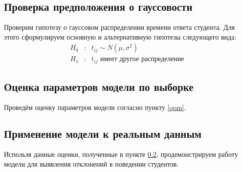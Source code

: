 \subsection{Проверка предположения о гауссовости}

Проверим гипотезу о гауссовом распределении времени ответа студента. Для этого сформулируем основную и альтернативную гипотезы следующего вида:
$$
\begin{array}{lll}
H_0 &:& t_{ij} \sim N\left(\mu,\sigma^2\right)\\
H_1 &:& t_{ij} \mbox{ имеет другое распределение}
\end{array}
$$

\subsection{Оценка параметров модели по выборке}
\label{opmpv}

Проведём оценку параметров модели согласно пункту \ref{opm}.

\subsection{Применение модели к реальным данным}

Использя данные оценки, полученные в пункте \ref{opmpv}, продемонстрируем работу модели для выявления отклонений в поведении студентов.